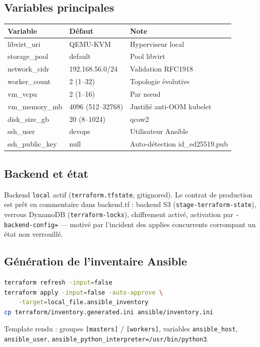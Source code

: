 \documentclass[12pt,a4paper]{article}
\begin{document}
\subsection{Variables principales}
\begin{longtable}{@{}p{4.6cm}p{4.0cm}p{5.6cm}@{}}
\toprule
\textbf{Variable} & \textbf{Défaut} & \textbf{Note} \\
\midrule
\endhead
libvirt\_uri & QEMU-KVM & Hyperviseur local \\
storage\_pool & default & Pool libvirt \\
network\_cidr & 192.168.56.0/24 & Validation RFC1918 \\
worker\_count & 2 (1--32) & Topologie évolutive \\
vm\_vcpu & 2 (1--16) & Par nœud \\
vm\_memory\_mb & 4096 (512--32768) & Justifié anti-OOM kubelet \\
disk\_size\_gb & 20 (8--1024) & qcow2 \\
ssh\_user & devops & Utilisateur Ansible \\
ssh\_public\_key & null & Auto-détection id\_ed25519.pub \\
\bottomrule
\end{longtable}

\subsection{Backend et état}
Backend \texttt{local} actif (\texttt{terraform.tfstate}, gitignored). Le contrat de production est prêt en commentaire dans backend.tf : backend S3 (\texttt{stage-terraform-state}), verrous DynamoDB (\texttt{terraform-locks}), chiffrement activé, activation par \texttt{-backend-config=} --- motivé par l'incident des applies concurrents corrompant un état non verrouillé.

\subsection{Génération de l'inventaire Ansible}
\begin{lstlisting}[language=bash,caption={Cycle inventaire : Terraform seule source de vérité (scripts/generate-inventory.sh)}]
terraform refresh -input=false
terraform apply -input=false -auto-approve \
    -target=local_file.ansible_inventory
cp terraform/inventory.generated.ini ansible/inventory.ini
\end{lstlisting}

Template rendu : groupes \texttt{[masters]} / \texttt{[workers]}, variables \texttt{ansible\_host}, \texttt{ansible\_user}, \texttt{ansible\_python\_interpreter=/usr/bin/python3}.
\end{document}
